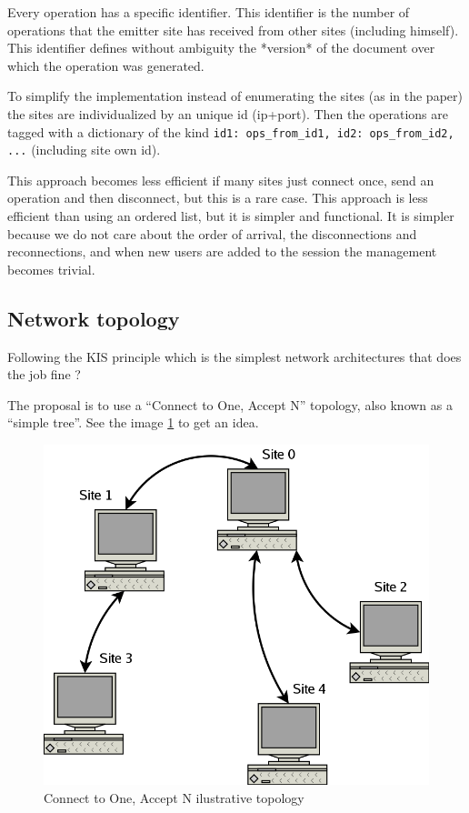 \documentclass{report}
\begin{document}
Every operation has a specific identifier. This identifier is the number of operations that the emitter site has received from other sites (including himself). This identifier defines without ambiguity the *version* of the document over which the operation was generated.

To simplify the implementation instead of enumerating the sites (as in the paper) the sites are individualized by an unique id (ip+port). Then the operations are tagged with a dictionary of the kind {\texttt {id1: ops\_from\_id1, id2: ops\_from\_id2, ...}} (including site own id).

This approach becomes less efficient if many sites just connect once, send an operation and then disconnect, but this is a rare case. This approach is less efficient than using an ordered list, but it is simpler and functional. It is simpler because we do not care about the order of arrival, the disconnections and reconnections, and when new users are added to the session the management becomes trivial.

\subsection{Network topology}

Following the KIS principle which is the simplest network architectures that does the job fine ?

The proposal is to use a ``Connect to One, Accept N'' topology, also known as a ``simple tree''. See the image \ref{fig:connectooneacceptN} to get an idea.    

\begin{figure}[htbp]
 \begin{center}
    \includegraphics[angle=0,width=0.5\linewidth]{schemas/connect_to_one_accept_N.png}
 \end{center}
 \caption{Connect to One, Accept N ilustrative topology}
 \label{fig:connectooneacceptN}
\end{figure}
\end{document}
